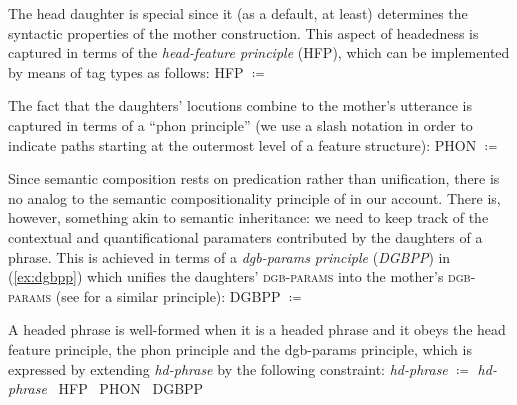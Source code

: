 \documentclass[output=paper
 	        ,biblatex
                ,babelshorthands
                ,newtxmath
                ,draftmode
                ,colorlinks, citecolor=brown
]{langscibook}
\begin{document}
The head daughter is special since it (as a default, at least) determines the syntactic properties of the mother construction. 
%
This aspect of headedness is captured in terms of the \emph{head-feature principle} (HFP), which can be implemented by means of tag types as follows:
%
\ea \label{ex:HFP}
HFP $\coloneqq$
\z

The fact that the daughters' locutions combine to the mother's utterance is captured in terms of a \enquote{phon principle}  (we use a slash notation in order to indicate paths starting at the outermost level of a feature structure):
%
\ea 
PHON $\coloneqq$ \label{ex:phon-principle}
\z 

Since  semantic composition rests on predication rather than unification, there is no analog to the semantic compositionality principle of \citet{Sag:Wasow:Bender:2003} in our account.
%
There is, however, something akin to semantic inheritance: we need to keep track of the contextual and quantificational paramaters contributed by the daughters of a phrase. 
%
This is achieved in terms of a \emph{dgb-params principle} (\emph{DGBPP}) in (\ref{ex:dgbpp}) which unifies the daughters' \textsc{dgb-params} into the mother's \textsc{dgb-params}  (see \citealt[126 \textit{et seq.}]{Ginzburg:2012}  for a similar principle): 
%
\ea \label{ex:dgbpp}
DGBPP $\coloneqq$ \label{ex:QPP} \par\medskip
{}
\z

A headed phrase is well-formed when it is a headed phrase and it obeys the head feature principle, the phon principle and the dgb-params principle, which is expressed by extending \emph{hd-phrase} by the following constraint:
%
\ea \label{ex:hd-phrase}
\emph{hd-phrase} $\coloneqq$ 
\emph{hd-phrase} \ttrmerge\ {HFP} \ttrmerge\  {PHON} \ttrmerge\ {DGBPP}
\z
\end{document}
